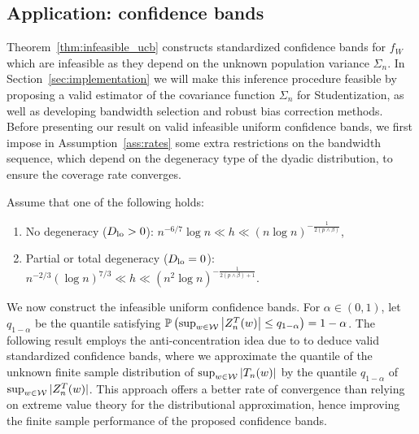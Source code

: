 \subsection{Application: confidence bands}

Theorem~\ref{thm:infeasible_ucb} constructs standardized confidence bands for
$f_W$ which are infeasible as they depend on the unknown population variance
$\Sigma_n$. In Section~\ref{sec:implementation} we will make this inference
procedure feasible by proposing a valid estimator of the covariance function
$\Sigma_n$ for Studentization, as well as developing bandwidth selection and
robust bias correction methods. Before presenting our result on valid
infeasible uniform confidence bands, we first impose in
Assumption~\ref{ass:rates} some extra restrictions on the bandwidth sequence,
which depend on the degeneracy type of the dyadic distribution, to ensure the
coverage rate converges.

\begin{assumption}
  \label{ass:rates}
  Assume that one of the following holds:
  \begin{enumerate}[label=(\roman*)]

    \item
      \label{it:rate_non}
      No degeneracy ($D_{\textup{lo}} > 0$):
      $n^{-6/7} \log n \ll h \ll (n \log n)^{-\frac{1}{2(p \wedge \beta)}}$,

    \item
      \label{it:rate_degen}
      Partial or total degeneracy ($D_{\textup{lo}} = 0$):
      $n^{-2/3} (\log n)^{7/3} \ll h
      \ll (n^2 \log n)^{-\frac{1}{2(p \wedge \beta) + 1}}$.
  \end{enumerate}
\end{assumption}

We now construct the infeasible uniform confidence bands.
For $\alpha \in (0,1)$, let $q_{1-\alpha}$ be the quantile satisfying
$ \mathbb{P}\left(\sup_{w \in \mathcal{W}} \left| Z_n^T(w) \right| \leq q_{1-\alpha} \right)
= 1 - \alpha$.
The following result employs the anti-concentration idea due to
\citet{chernozhukov2014anti} to deduce valid standardized confidence bands,
where we approximate the quantile of the unknown finite sample distribution of
$\sup_{w\in\mathcal{W}} |T_n(w)|$ by the quantile $q_{1-\alpha}$ of
$\sup_{w\in\mathcal{W}}|Z_n^T(w)|$. This approach offers a better rate of convergence
than relying on extreme value theory for the distributional approximation,
hence improving the finite sample performance of the proposed confidence bands.

